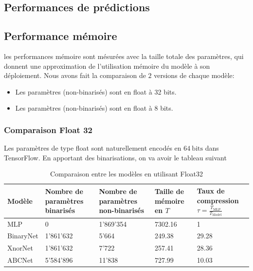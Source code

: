 \subsection{Performances de prédictions}
\subsection{Performance mémoire}
les performances mémoire sont mésurées avec la taille totale des paramètres, qui donnent une approximation de l'utilisation mémoire du modèle à son déploiement.
\newline Nous avons fait la comparaison de $2$ versions de chaque modèle:
\begin{itemize}
	\item Les paramètres (non-binarisés) sont en float à 32 bits.
	\item Les paramètres (non-binarisés) sont en float à 8 bits.
\end{itemize}
\subsubsection{Comparaison Float 32}
Les paramètres de type float sont naturellement encodés en $64 \ \text{bits}$ dans TensorFlow. En apportant des binarisations, on va avoir le tableau suivant
\begin{table}[h]
	\begin{tabularx}{\textwidth}{| X | X | X | X | X |}
		\hline
		
		Modèle & Nombre de paramètres binarisés &  Nombre de paramètres non-binarisés &  Taille de mémoire en \text{KB} \newline $T$ &  Taux de compression $\tau=\frac{T_{\text{MLP}}}{T_{\text{Model}}}$ \\
		\hline
		MLP & 0 & 1'869'354 & 7302.16 & 1 \\
		\hline 
		BinaryNet & 1'861'632 & 5'664 & 249.38 & 29.28 \\
		\hline
		XnorNet & 1'861'632 & 7'722 & 257.41 & 28.36 \\
		\hline
		ABCNet & 5'584'896 & 11'838 & 727.99 & 10.03 \\
		\hline
	\end{tabularx}
	\caption{Comparaison entre les modèles en utilisant Float32 }
\end{table}
\FloatBarrier
